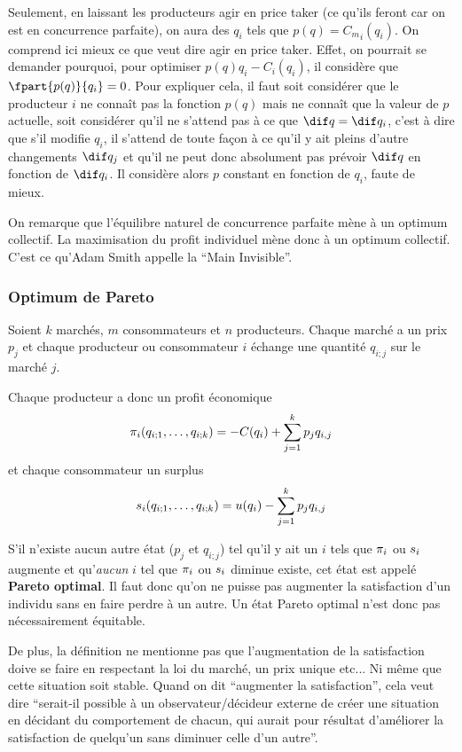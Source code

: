 Seulement, en laissant les producteurs agir en price taker
(ce qu'ils feront car on est en concurrence parfaite),
on aura des $q_i$ tels que $p(q) = {C_m}_i(q_i)$.
On comprend ici mieux ce que veut dire agir en price taker.
Effet, on pourrait se demander pourquoi, pour optimiser
$p(q)q_i - {C}_i(q_i)$, il considère que $\fpart{p(q)}{q_i} = 0$.
Pour expliquer cela,
il faut soit considérer que le producteur $i$ ne connaît pas la fonction $p(q)$
mais ne connaît que la valeur de $p$ actuelle, soit considérer qu'il
ne s'attend pas à ce que $\dif q = \dif q_i$, c'est à dire que s'il modifie
$q_i$, il s'attend de toute façon à ce qu'il y ait pleins d'autre changements
$\dif q_j$ et qu'il ne peut donc absolument pas prévoir $\dif q$ en fonction
de $\dif q_i$. Il considère alors $p$ constant en fonction de $q_i$,
faute de mieux.

On remarque que l'équilibre naturel de concurrence parfaite mène à
un optimum collectif.
La maximisation du profit individuel mène donc à un optimum collectif.
C'est ce qu'Adam Smith appelle la ``Main Invisible''.

\subsubsection{Optimum de Pareto}
Soient $k$ marchés, $m$ consommateurs et $n$ producteurs.
Chaque marché a un prix $p_j$ et chaque producteur ou consommateur $i$
échange une quantité $q_{i;j}$ sur le marché $j$.

Chaque producteur a donc un profit économique
\[ \pi_i(q_{i;1},\ldots,q_{i;k}) = -C(q_i) + \sum_{j=1}^k p_jq_{i,j} \]
et chaque consommateur un surplus
\[ s_i(q_{i;1},\ldots,q_{i;k}) = u(q_i) - \sum_{j=1}^k p_jq_{i,j} \]

S'il n'existe aucun autre état ($p_j$ et $q_{i;j}$)
tel qu'il y ait un $i$ tels que $\pi_i$ ou $s_i$ augmente et
qu'\emph{aucun} $i$ tel que $\pi_i$ ou $s_i$ diminue existe,
cet état est appelé \textbf{Pareto optimal}.
Il faut donc qu'on ne puisse pas augmenter la satisfaction d'un individu
sans en faire perdre à un autre.
Un état Pareto optimal n'est donc pas nécessairement équitable.

De plus,
la définition ne mentionne pas que l'augmentation de la satisfaction doive
se faire en respectant la loi du marché,
un prix unique etc...
Ni même que cette situation soit stable.
Quand on dit ``augmenter la satisfaction'',
cela veut dire ``serait-il possible à un observateur/décideur
externe de créer une situation en décidant du comportement de chacun,
qui aurait pour résultat d'améliorer la satisfaction
de quelqu'un sans diminuer celle d'un autre''.

